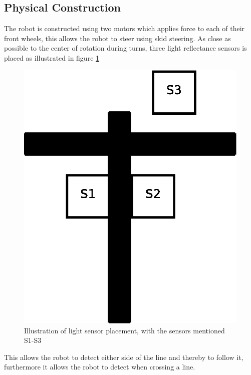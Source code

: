 \documentclass[draft, english, a4paper, 10pt]{article}
\begin{document}
	\subsection{Physical Construction} %
	    \label{robot:physicalContruction}
	    The robot is constructed using two motors which applies force to
	    each of their front wheels, this allows the robot to steer using skid steering.
	    As close as possible to the center of rotation during turns, three light
	    reflectance sensors is placed as illustrated in figure \ref{fig:lightSensorPlacement}
	    \begin{figure}[htp]
            \centering
    	    \includegraphics[scale=0.45]{lightSensorPlacement}
	        \caption{Illustration of light sensor placement, with the sensors mentioned S1-S3}\label{fig:lightSensorPlacement}
        \end{figure}
	    This allows the robot to detect either side of the line and thereby to
	    follow it, furthermore it allows the robot to detect when crossing a 
	    line.
	      
\end{document}
